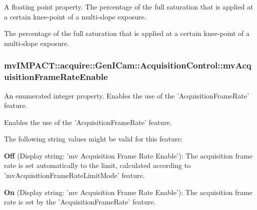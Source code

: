 A floating point property. The percentage of the full saturation that is applied at a certain knee-\/point of a multi-\/slope exposure. 

The percentage of the full saturation that is applied at a certain knee-\/point of a multi-\/slope exposure. \hypertarget{classmv_i_m_p_a_c_t_1_1acquire_1_1_gen_i_cam_1_1_acquisition_control_a9e010a85b016530779b5eed1a95bfa7f}{
\subsubsection[{mv\+Acquisition\+Frame\+Rate\+Enable}]{ mv\+I\+M\+P\+A\+C\+T\+::acquire\+::\+Gen\+I\+Cam\+::\+Acquisition\+Control\+::mv\+Acquisition\+Frame\+Rate\+Enable}}\label{classmv_i_m_p_a_c_t_1_1acquire_1_1_gen_i_cam_1_1_acquisition_control_a9e010a85b016530779b5eed1a95bfa7f}


An enumerated integer property. Enables the use of the 'Acquisition\+Frame\+Rate' feature. 

Enables the use of the 'Acquisition\+Frame\+Rate' feature.

The following string values might be valid for this feature\+:
\begin{DoxyItemize}
\item {\bfseries Off} (Display string\+: 'mv Acquisition Frame Rate Enable')\+: The acquisition frame rate is set automatically to the limit, calculated according to 'mv\+Acquisition\+Frame\+Rate\+Limit\+Mode' feature.
\item {\bfseries On} (Display string\+: 'mv Acquisition Frame Rate Enable')\+: The acquisition frame rate is set by the 'Acquisition\+Frame\+Rate' feature.
\end{DoxyItemize}


